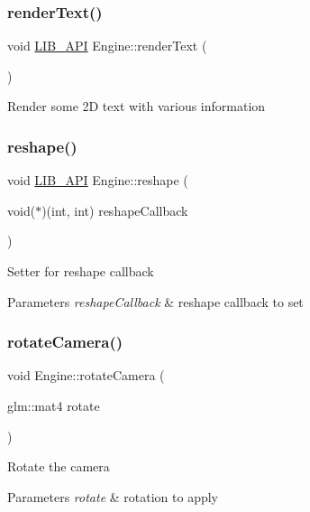 \subsubsection{\texorpdfstring{render\+Text()}{renderText()}}
{\footnotesize\ttfamily void \hyperlink{Engine_8h_a77278c8cc96e39fb27b5d0a347c8fb3d}{L\+I\+B\+\_\+\+A\+PI} Engine\+::render\+Text (\begin{DoxyParamCaption}{ }\end{DoxyParamCaption})}

Render some 2D text with various information \mbox{\label{classEngine_af43e72719048ae70cb4c50c0b76c5ec7}} 
\subsubsection{\texorpdfstring{reshape()}{reshape()}}
{\footnotesize\ttfamily void \hyperlink{Engine_8h_a77278c8cc96e39fb27b5d0a347c8fb3d}{L\+I\+B\+\_\+\+A\+PI} Engine\+::reshape (\begin{DoxyParamCaption}\item[{void($\ast$)(int, int)}]{reshape\+Callback }\end{DoxyParamCaption})}

Setter for reshape callback 
\begin{DoxyParams}{Parameters}
{\em reshape\+Callback} & reshape callback to set \\
\hline
\end{DoxyParams}
\mbox{\label{classEngine_aa6e7ac4ee48c5288089d6d717b421168}} 
\subsubsection{\texorpdfstring{rotate\+Camera()}{rotateCamera()}}
{\footnotesize\ttfamily void Engine\+::rotate\+Camera (\begin{DoxyParamCaption}\item[{glm\+::mat4}]{rotate }\end{DoxyParamCaption})}

Rotate the camera 
\begin{DoxyParams}{Parameters}
{\em rotate} & rotation to apply \\
\hline
\end{DoxyParams}
\mbox{\label{classEngine_a762a16ea87e60e95bbeff740e29e2ef0}} 
